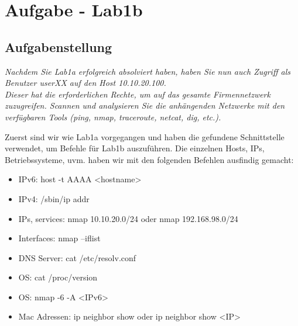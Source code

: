 \documentclass[12pt,a4paper,titlepage,oneside]{scrartcl}
\begin{document}
\section{Aufgabe - Lab1b}

\subsection{Aufgabenstellung}
\emph{Nachdem Sie Lab1a erfolgreich absolviert haben, haben Sie nun auch Zugriff als Benutzer userXX auf den Host 10.10.20.100.\\
Dieser hat die erforderlichen Rechte, um auf das gesamte Firmennetzwerk zuzugreifen. Scannen und analysieren Sie die anhängenden Netzwerke mit den verfügbaren Tools (ping, nmap, traceroute, netcat, dig, etc.).}

Zuerst sind wir wie Lab1a vorgegangen und haben die gefundene Schnittstelle verwendet, um Befehle für Lab1b auszuführen. Die einzelnen Hosts, IPs, Betriebssysteme, uvm. haben wir mit den folgenden Befehlen ausfindig gemacht:

\begin{itemize}
\item IPv6: host -t AAAA <hostname>
\item IPv4: /sbin/ip addr
\item IPs, services: nmap 10.10.20.0/24 oder nmap 192.168.98.0/24
\item Interfaces: nmap --iflist
\item DNS Server: cat /etc/resolv.conf
\item OS: cat /proc/version
\item OS: nmap -6 -A <IPv6>
\item Mac Adressen: ip neighbor show oder ip neighbor show <IP>
\end{itemize} 
\end{document}
